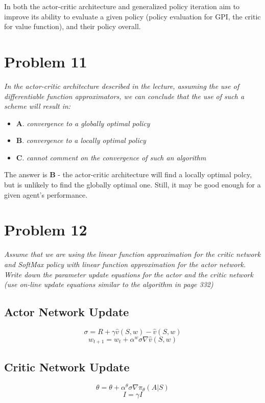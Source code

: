 \documentclass{article}
\begin{document}
In both the actor-critic architecture and generalized policy iteration aim to improve its ability to evaluate a given policy (policy evaluation for GPI, the critic for value function), and their policy overall.

\section*{Problem 11}
\textit{In the actor-critic architecture described in the lecture, assuming the use of differentiable
function approximators, we can conclude that the use of such a scheme will result in:}
\begin{itemize}
    \item \textbf{A}. \textit{convergence to a globally optimal policy}
    \item \textbf{B}. \textit{convergence to a locally optimal policy}
    \item \textbf{C}. \textit{cannot comment on the convergence of such an algorithm}
\end{itemize}

The answer is \textbf{B} - the actor-critic architecture will find a locally optimal polcy, but is unlikely to find the globally optimal one. Still, it may be good enough for a given agent's performance.

\section*{Problem 12}
\textit{Assume that we are using the linear function approximation for the critic network and SoftMax policy with linear function approximation for the actor network. Write down the parameter update equations for the actor and the critic network (use on-line update equations similar to the algorithm in page 332)}

\subsection*{Actor Network Update}
\begin{equation}
    \sigma = R + \gamma \hat{v} (S,w) - \hat{v} (S,w)
\end{equation}
\begin{equation}
    w_{t+1} = w_t + \alpha^w \sigma \nabla \hat{v} (S,w)
\end{equation}

\subsection*{Critic Network Update}
\begin{equation}
    \theta = \theta + \alpha^\theta \sigma \nabla \pi_\theta (A | S)
\end{equation}
\begin{equation}
    I = \gamma I
\end{equation}
\end{document}
